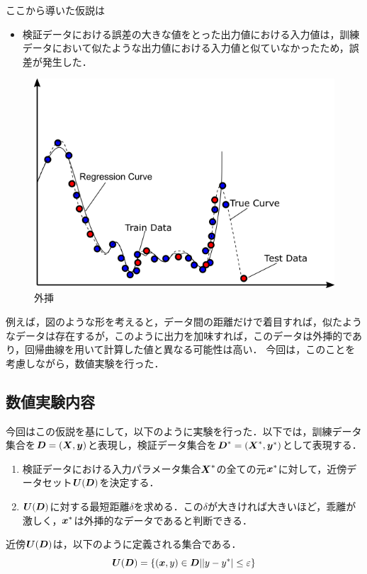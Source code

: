 \documentclass[16.7pt]{jsarticle}
\begin{document}
		ここから導いた仮説は
		\begin{itemize}
			\item 検証データにおける誤差の大きな値をとった出力値における入力値は，訓練データにおいて似たような出力値における入力値と似ていなかったため，誤差が発生した．
		\end{itemize}
		\begin{figure}[h]
			\centering
			\includegraphics[width= 0.55\columnwidth]{./figure/DataSciences.png}
			\caption{外挿}
		\end{figure}
		例えば，図のような形を考えると，データ間の距離だけで着目すれば，似たようなデータは存在するが，このように出力を加味すれば，このデータは外挿的であり，回帰曲線を用いて計算した値と異なる可能性は高い．
		今回は，このことを考慮しながら，数値実験を行った．
		\subsection{数値実験内容}
		今回はこの仮説を基にして，以下のように実験を行った．以下では，訓練データ集合を$ \boldsymbol{D} = (\boldsymbol{X},\boldsymbol{y}) $と表現し，検証データ集合を$ \boldsymbol{D}^* = (\boldsymbol{X}^*,\boldsymbol{y}^*) $として表現する．
		\begin{enumerate}
			\item 検証データにおける入力パラメータ集合$ \boldsymbol{X}^* $の全ての元$ \boldsymbol{x}^*$に対して，近傍データセット$ \boldsymbol{U}(\boldsymbol{D}) $を決定する．
			\item $ \boldsymbol{U}(\boldsymbol{D}) $に対する最短距離$ \delta $を求める．この$ \delta $が大きければ大きいほど，乖離が激しく，$ \boldsymbol{x}^* $は外挿的なデータであると判断できる．
		\end{enumerate}
		近傍$ \boldsymbol{U}(\boldsymbol{D}) $は，以下のように定義される集合である．
		\begin{equation}\label{eq:Neighborhood}
			\boldsymbol{U}(\boldsymbol{D}) = \{ (\boldsymbol{x},y) \in \boldsymbol{D}| |y-y^*| \leq \varepsilon \}
		\end{equation}
	
\end{document}
